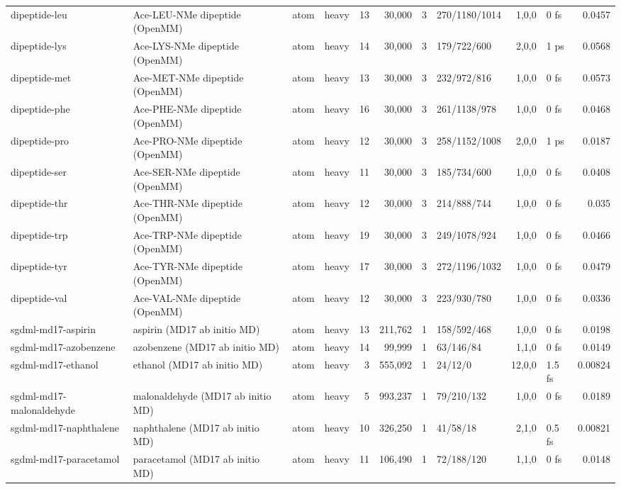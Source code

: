 \documentclass[10pt]{article}
\begin{document}
\begin{small}
\begin{longtable}{p{3.9cm}p{5.2cm}llrrrlrlr}
dipeptide-leu & Ace-LEU-NMe dipeptide (OpenMM) & atom & heavy & 13 & 30,000 & 3 & 270/1180/1014 & 1,0,0 & 0 fs & 0.0457\\
dipeptide-lys & Ace-LYS-NMe dipeptide (OpenMM) & atom & heavy & 14 & 30,000 & 3 & 179/722/600 & 2,0,0 & 1 ps & 0.0568\\
dipeptide-met & Ace-MET-NMe dipeptide (OpenMM) & atom & heavy & 13 & 30,000 & 3 & 232/972/816 & 1,0,0 & 0 fs & 0.0573\\
dipeptide-phe & Ace-PHE-NMe dipeptide (OpenMM) & atom & heavy & 16 & 30,000 & 3 & 261/1138/978 & 1,0,0 & 0 fs & 0.0468\\
dipeptide-pro & Ace-PRO-NMe dipeptide (OpenMM) & atom & heavy & 12 & 30,000 & 3 & 258/1152/1008 & 2,0,0 & 1 ps & 0.0187\\
dipeptide-ser & Ace-SER-NMe dipeptide (OpenMM) & atom & heavy & 11 & 30,000 & 3 & 185/734/600 & 1,0,0 & 0 fs & 0.0408\\
dipeptide-thr & Ace-THR-NMe dipeptide (OpenMM) & atom & heavy & 12 & 30,000 & 3 & 214/888/744 & 1,0,0 & 0 fs & 0.035\\
dipeptide-trp & Ace-TRP-NMe dipeptide (OpenMM) & atom & heavy & 19 & 30,000 & 3 & 249/1078/924 & 1,0,0 & 0 fs & 0.0466\\
dipeptide-tyr & Ace-TYR-NMe dipeptide (OpenMM) & atom & heavy & 17 & 30,000 & 3 & 272/1196/1032 & 1,0,0 & 0 fs & 0.0479\\
dipeptide-val & Ace-VAL-NMe dipeptide (OpenMM) & atom & heavy & 12 & 30,000 & 3 & 223/930/780 & 1,0,0 & 0 fs & 0.0336\\
sgdml-md17-aspirin & aspirin (MD17 ab initio MD) & atom & heavy & 13 & 211,762 & 1 & 158/592/468 & 1,0,0 & 0 fs & 0.0198\\
sgdml-md17-azobenzene & azobenzene (MD17 ab initio MD) & atom & heavy & 14 & 99,999 & 1 & 63/146/84 & 1,1,0 & 0 fs & 0.0149\\
sgdml-md17-ethanol & ethanol (MD17 ab initio MD) & atom & heavy & 3 & 555,092 & 1 & 24/12/0 & 12,0,0 & 1.5 fs & 0.00824\\
sgdml-md17-malonaldehyde & malonaldehyde (MD17 ab initio MD) & atom & heavy & 5 & 993,237 & 1 & 79/210/132 & 1,0,0 & 0 fs & 0.0189\\
sgdml-md17-naphthalene & naphthalene (MD17 ab initio MD) & atom & heavy & 10 & 326,250 & 1 & 41/58/18 & 2,1,0 & 0.5 fs & 0.00821\\
sgdml-md17-paracetamol & paracetamol (MD17 ab initio MD) & atom & heavy & 11 & 106,490 & 1 & 72/188/120 & 1,1,0 & 0 fs & 0.0148\\

\end{longtable}
\end{small}
\end{document}
